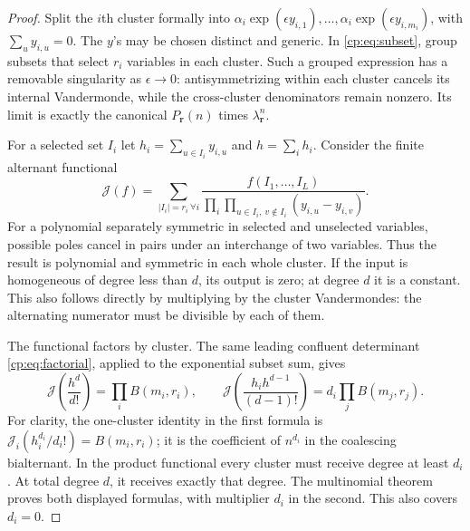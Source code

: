 \documentclass[11pt]{article}
\theoremstyle{definition}
\theoremstyle{remark}
\theoremstyle{definition}
\theoremstyle{plain}
\numberwithin{equation}{section}
\begin{document}
\begin{proof}
Split the $i$th cluster formally into
$\alpha_i\exp(\epsilon y_{i,1}),\ldots,
\alpha_i\exp(\epsilon y_{i,m_i})$, with
$\sum_u y_{i,u}=0$. The $y$'s may be chosen distinct and generic.
In \eqref{cp:eq:subset}, group subsets that select $r_i$ variables in each
cluster. Such a grouped expression has a removable singularity as
$\epsilon\to0$: antisymmetrizing within each cluster cancels its
internal Vandermonde, while the cross-cluster denominators remain nonzero.
Its limit is exactly the canonical $P_{\boldsymbol r}(n)$ times
$\lambda_{\boldsymbol r}^n$.

For a selected set $I_i$ let $h_i=\sum_{u\in I_i}y_{i,u}$ and
$h=\sum_i h_i$. Consider the finite alternant functional
\begin{equation}
 \mathcal J(f)=
 \sum_{|I_i|=r_i\ \forall i}
 \frac{f(I_1,\ldots,I_L)}
 {\displaystyle\prod_i\prod_{u\in I_i,\ v\notin I_i}(y_{i,u}-y_{i,v})}.
 \label{cp:eq:functional}
\end{equation}
For a polynomial separately symmetric in selected and unselected variables,
possible poles cancel in pairs under an interchange of two variables.
Thus the result is polynomial and symmetric in each whole cluster. If the
input is homogeneous of degree less than $d$, its output is zero; at degree
$d$ it is a constant. This also follows directly by multiplying by the
cluster Vandermondes: the alternating numerator must be divisible by each
of them.

The functional factors by cluster. The same leading confluent determinant
\eqref{cp:eq:factorial}, applied to the exponential subset sum, gives
\begin{equation}
 \mathcal J\left(\frac{h^d}{d!}\right)=\prod_i B(m_i,r_i),\qquad
 \mathcal J\left(\frac{h_i h^{d-1}}{(d-1)!}\right)
 =d_i\prod_j B(m_j,r_j).
 \label{cp:eq:functionalvalues}
\end{equation}
For clarity, the one-cluster identity in the first formula is
$\mathcal J_i(h_i^{d_i}/d_i!)=B(m_i,r_i)$; it is the coefficient of
$n^{d_i}$ in the coalescing bialternant. In the product functional every
cluster must receive degree at least $d_i$. At total degree $d$, it
receives exactly that degree. The multinomial theorem proves both displayed
formulas, with multiplier $d_i$ in the second. This also covers $d_i=0$.


\end{proof}
\end{document}
